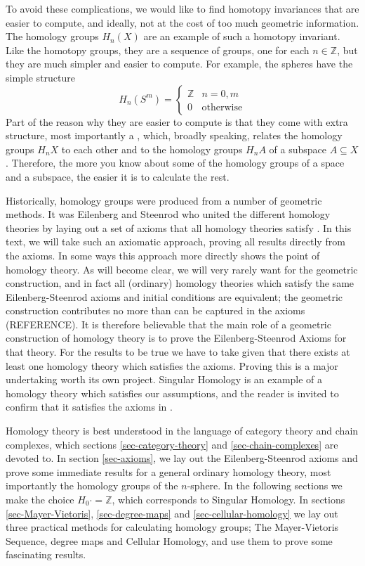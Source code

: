 To avoid these complications, we would like to find homotopy invariances that are easier to compute, and ideally, not at the cost of too much geometric information. The homology groups $H_n(X)$ are an example of such a homotopy invariant. Like the homotopy groups, they are a sequence of groups, one for each $n\in \mathbb{Z}$, but they are much simpler and easier to compute. For example, the spheres have the simple structure $$H_n(S^m)=\begin{cases}\mathbb{Z} & n=0,m\\ 0 & \text{otherwise}\end{cases}$$
Part of the reason why they are easier to compute is that they come with extra structure, most importantly a , which, broadly speaking, relates the homology groups $H_nX$ to each other and to the homology groups $H_nA$ of a subspace $A\subseteq X$. Therefore, the more you know about some of the homology groups of a space and a subspace, the easier it is to calculate the rest.

Historically, homology groups were produced from a number of geometric methods. It was Eilenberg and Steenrod who united the different homology theories by laying out a set of axioms that all homology theories satisfy \cite{Eilenberg}. In this text, we will take such an axiomatic approach, proving all results directly from the axioms. In some ways this approach more directly shows the point of homology theory. As will become clear, we will very rarely want for the geometric construction, and in fact all (ordinary) homology theories which satisfy the same Eilenberg-Steenrod axioms and initial conditions are equivalent; the geometric construction contributes no more than can be captured in the axioms (REFERENCE). It is therefore believable that the main role of a geometric construction of homology theory is to prove the Eilenberg-Steenrod Axioms for that theory. For the results to be true we have to take given that there exists at least one homology theory which satisfies the axioms. Proving this is a major undertaking worth its own project. Singular Homology is an example of a homology theory which satisfies our assumptions, and the reader is invited to confirm that it satisfies the axioms in \cite{Hatcher}.

Homology theory is best understood in the language of category theory and chain complexes, which sections \ref{sec-category-theory} and \ref{sec-chain-complexes} are devoted to. In section \ref{sec-axioms}, we lay out the Eilenberg-Steenrod axioms and prove some immediate results for a general ordinary homology theory, most importantly the homology groups of the $n$-sphere. In the following sections we make the choice $H_0 \cdot=\mathbb{Z}$, which corresponds to Singular Homology. In sections \ref{sec-Mayer-Vietoris}, \ref{sec-degree-maps} and \ref{sec-cellular-homology} we lay out three practical methods for calculating homology groups; The Mayer-Vietoris Sequence, degree maps and Cellular Homology, and use them to prove some fascinating results.